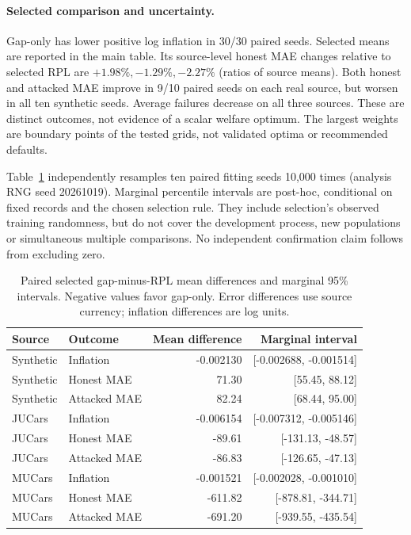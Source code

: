 \documentclass[11pt]{article}
\begin{document}
\paragraph{Selected comparison and uncertainty.}
Gap-only has lower positive log inflation in 30/30 paired seeds.
Selected means are reported in the main table. Its source-level honest
MAE changes relative to selected RPL are $+1.98\%,-1.29\%,-2.27\%$
(ratios of source means). Both honest and attacked MAE improve in 9/10
paired seeds on each real source, but worsen in all ten synthetic seeds.
Average failures decrease on all three sources. These are distinct outcomes,
not evidence of a scalar welfare optimum. The largest weights are boundary
points of the tested grids, not validated optima or recommended defaults.

Table~\ref{tab:gap_paired} independently resamples ten paired fitting seeds
10,000 times (analysis RNG seed 20261019). Marginal percentile intervals are
post-hoc, conditional on fixed records and the chosen selection rule. They
include selection's observed training randomness, but do not cover the
development process, new populations or simultaneous multiple comparisons.
No independent confirmation claim follows from excluding zero.
\begin{table}[htbp]\centering\small
\caption{Paired selected gap-minus-RPL mean differences and marginal 95\%
intervals. Negative values favor gap-only. Error differences use source
currency; inflation differences are log units.}
\label{tab:gap_paired}
\begin{tabular}{llrr}\toprule
Source & Outcome & Mean difference & Marginal interval\\\midrule
Synthetic & Inflation & -0.002130 & [-0.002688, -0.001514]\\
Synthetic & Honest MAE & 71.30 & [55.45, 88.12]\\
Synthetic & Attacked MAE & 82.24 & [68.44, 95.00]\\
\midrule
JUCars & Inflation & -0.006154 & [-0.007312, -0.005146]\\
JUCars & Honest MAE & -89.61 & [-131.13, -48.57]\\
JUCars & Attacked MAE & -86.83 & [-126.65, -47.13]\\
\midrule
MUCars & Inflation & -0.001521 & [-0.002028, -0.001010]\\
MUCars & Honest MAE & -611.82 & [-878.81, -344.71]\\
MUCars & Attacked MAE & -691.20 & [-939.55, -435.54]\\
\bottomrule\end{tabular}\end{table}
\end{document}
